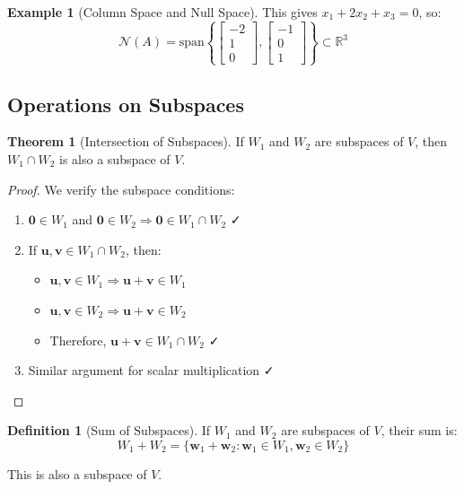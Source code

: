 \documentclass[12pt,a4paper]{article}
\theoremstyle{definition}
\newtheorem{definition}{Definition}[section]
\newtheorem{theorem}{Theorem}[section]
\newtheorem{example}{Example}[section]
\begin{document}
\begin{example}[Column Space and Null Space]
This gives $x_1 + 2x_2 + x_3 = 0$, so:
\begin{equation}
\mathcal{N}(A) = \text{span}\left\{\begin{bmatrix} -2 \\ 1 \\ 0 \end{bmatrix}, \begin{bmatrix} -1 \\ 0 \\ 1 \end{bmatrix}\right\} \subset \mathbb{R}^3
\end{equation}
\end{example}

\subsection{Operations on Subspaces}

\begin{theorem}[Intersection of Subspaces]
If $W_1$ and $W_2$ are subspaces of $V$, then $W_1 \cap W_2$ is also a subspace of $V$.
\end{theorem}

\begin{proof}
We verify the subspace conditions:
\begin{enumerate}
    \item $\mathbf{0} \in W_1$ and $\mathbf{0} \in W_2 \Rightarrow \mathbf{0} \in W_1 \cap W_2$ ✓
    \item If $\mathbf{u}, \mathbf{v} \in W_1 \cap W_2$, then:
    \begin{itemize}
        \item $\mathbf{u}, \mathbf{v} \in W_1 \Rightarrow \mathbf{u} + \mathbf{v} \in W_1$
        \item $\mathbf{u}, \mathbf{v} \in W_2 \Rightarrow \mathbf{u} + \mathbf{v} \in W_2$
        \item Therefore, $\mathbf{u} + \mathbf{v} \in W_1 \cap W_2$ ✓
    \end{itemize}
    \item Similar argument for scalar multiplication ✓
\end{enumerate}
\end{proof}

\begin{definition}[Sum of Subspaces]
If $W_1$ and $W_2$ are subspaces of $V$, their sum is:
\begin{equation}
W_1 + W_2 = \{\mathbf{w}_1 + \mathbf{w}_2 : \mathbf{w}_1 \in W_1, \mathbf{w}_2 \in W_2\}
\end{equation}

This is also a subspace of $V$.
\end{definition}
\end{document}
